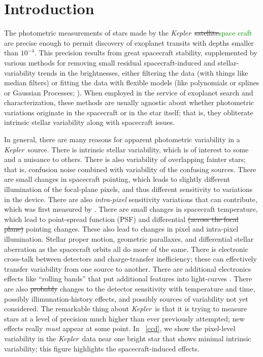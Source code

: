 \documentclass[12pt, preprint]{aastex}
\newcommand{\project}[1]{\textsl{#1}}
\newcommand{\Kepler}{\project{Kepler}}
\newcommand{\revise}[1]{\textcolor{green}{#1}}
\newcommand{\remove}[1]{\sout{#1}}
\begin{document}
\section{Introduction}

The photometric measurements of stars made by the \Kepler\ \remove{satellite}\revise{space craft} are precise enough
  to permit discovery of exoplanet transits with depths smaller than $10^{-4}$.
This precision results from great spacecraft stability,
  supplemented by various methods for removing small residual spacecraft-induced and stellar-variability trends in the brightnesses,
  either filtering the data (with things like median filters)
  or fitting the data with flexible models (like polynomials or splines or Gaussian Processes; 
  \cite{gaussian}).
When employed in the service of exoplanet search and characterization,
  these methods are usually agnostic about whether photometric variations originate in the spacecraft or in the star itself;
  that is, they obliterate intrinsic stellar variability along with spacecraft issues.

In general, there are many reasons for apparent photometric variability in a \Kepler\ source.
There is intrinsic stellar variability,
  which is of interest to some and a nuisance to others.
There is also variability of overlapping fainter stars;
  that is, confusion noise combined with variability of the confusing sources.
There are small changes in spacecraft pointing,
  which leads to slightly different illumination of the focal-plane pixels,
  and thus different sensitivity to variations in the device.
There are also \emph{intra-pixel} sensitivity variations that can contribute, which was first measured by \revise{\cite{subpixel}}.
There are small changes in spacecraft temperature,
  which lead to point-spread function (PSF) and differential \remove{(across the focal plane)} pointing changes.
These also lead to changes in pixel and intra-pixel illumination.
Stellar proper motion, geometric parallaxes, and differential stellar aberration as the spacecraft orbits all do more of the same.
There is electronic cross-talk between detectors and charge-transfer inefficiency;
  these can effectively transfer variability from one source to another.
There are additional electronics effects like ``rolling bands'' that put additional features into light-curves \revise{\citep{handbook}}.
There are also \remove{probably} changes to the detector sensitivity with temperature and time,
  possibly illimunation-history effects,
  and possibly sources of variability not yet considered.
The remarkable thing about \Kepler\ is that it is trying to measure stars at a level of precision
  much higher than ever previously attempted;
  new effects really \emph{must} appear at some point.
In \figurename~\ref{ccd}, we show the pixel-level variability in the \Kepler\ data
  near one bright star that shows minimal intrinsic variability;
  this figure highlights the spacecraft-induced effects.
\end{document}
